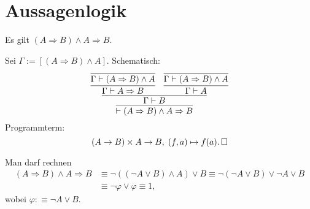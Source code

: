 \newpage
\section{Aussagenlogik}

\begin{Satz}%
\newlinefirst
Es gilt $(A\Rightarrow B)\land A \Rightarrow B$.
\end{Satz}
\begin{Beweis}[Beweis 1]
Sei $\Gamma:=[(A\Rightarrow B)\land A]$. Schematisch:
\[\infer{\vdash (A\Rightarrow B)\land A\Rightarrow B}{
    \infer{\Gamma\vdash B}{
      \infer{\Gamma\vdash A\Rightarrow B}{
        \infer{\Gamma\vdash (A\Rightarrow B)\land A}{}}
      & \infer{\Gamma\vdash A}{
        \infer{\Gamma\vdash (A\Rightarrow B)\land A}{}}}}\]
Programmterm:
\[(A\to B)\times A\to B,\; (f, a)\mapsto f(a).\,\square\]
\end{Beweis}

\begin{Beweis}
Man darf rechnen
\begin{align*}
(A\Rightarrow B)\land A \Rightarrow B &\equiv
\neg ((\neg A\lor B)\land A) \lor B
\equiv\neg (\neg A\lor B) \lor \neg A \lor B\\
&\equiv \neg\varphi\lor\varphi\equiv 1,
\end{align*}
wobei $\varphi :\equiv \neg A\lor B$.\;\qedsymbol
\end{Beweis}

